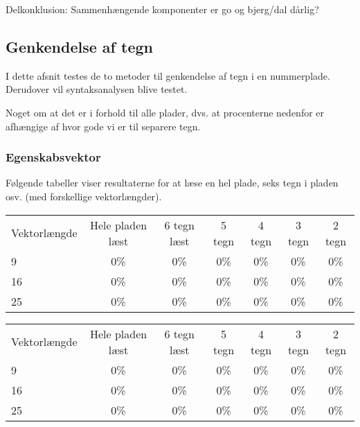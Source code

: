 Delkonklusion:
Sammenhængende komponenter er go og bjerg/dal dårlig?


\subsection{Genkendelse af tegn}
I dette afsnit testes de to metoder til genkendelse af tegn i en nummerplade. Derudover vil syntaksanalysen blive testet.

Noget om at det er i forhold til alle plader, dvs. at procenterne nedenfor er afhængige af hvor gode vi er til separere tegn.

\subsubsection{Egenskabsvektor}


Følgende tabeller viser resultaterne for at læse en hel plade, seks tegn i pladen osv. (med forskellige vektorlængder).

\begin{tabular}{|l|c|c|c|c|c|c|}\hline
\rowcolor[gray]{0.9} \multicolumn{7}{|>{\columncolor[gray]{0.9}}c|}{\textbf{Træningssæt}} \\ \hline
Vektorlængde & Hele pladen læst & 6 tegn læst & 5 tegn & 4 tegn & 3 tegn & 2 tegn \\\hline
9 & 0\% & 0\% & 0\% & 0\% & 0\% & 0\% \\\hline
16 & 0\% & 0\% & 0\% & 0\% & 0\% & 0\% \\\hline
25 & 0\% & 0\% & 0\% & 0\% & 0\% & 0\% \\\hline \end{tabular}

\begin{tabular}{|l|c|c|c|c|c|c|}\hline
\rowcolor[gray]{0.9} \multicolumn{7}{|>{\columncolor[gray]{0.9}}c|}{\textbf{Kontrolsæt}} \\ \hline
Vektorlængde & Hele pladen læst & 6 tegn læst & 5 tegn & 4 tegn & 3 tegn & 2 tegn \\\hline
9 & 0\% & 0\% & 0\% & 0\% & 0\% & 0\% \\\hline
16 & 0\% & 0\% & 0\% & 0\% & 0\% & 0\% \\\hline
25 & 0\% & 0\% & 0\% & 0\% & 0\% & 0\% \\\hline \end{tabular}

